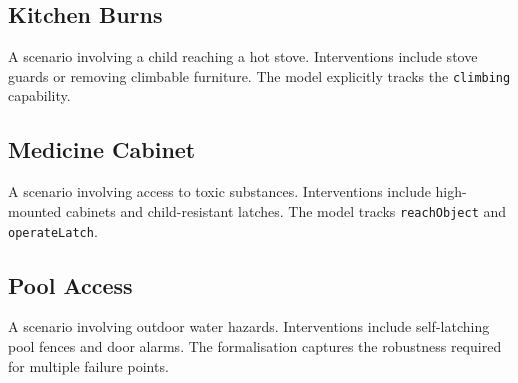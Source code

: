 \subsection{Kitchen Burns}
A scenario involving a child reaching a hot stove. Interventions include stove guards or removing climbable furniture. The model explicitly tracks the \texttt{climbing} capability.

\subsection{Medicine Cabinet}
A scenario involving access to toxic substances. Interventions include high-mounted cabinets and child-resistant latches. The model tracks \texttt{reachObject} and \texttt{operateLatch}.

\subsection{Pool Access}
A scenario involving outdoor water hazards. Interventions include self-latching pool fences and door alarms. The formalisation captures the robustness required for multiple failure points.
